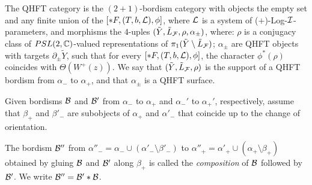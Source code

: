 \begin{defi} \label{QHBdef} {\rm The QHFT category is the
    $(2+1)$-bordism category with objects the empty set
    and any finite union of the $[*F,(T,b,{\mathcal L}),\phi]$, where ${\mathcal L}$ is a
    system of ($+$)-Log-${\mathcal I}$-parameters, and morphisms the 4-uples
    $(\tilde{Y},\tilde{L}_{\mathcal F},\rho,\alpha_\pm)$, where: $\rho$ is a
    conjugacy class of $PSL(2,{\mathbb C})$-valued representations of
    $\pi_1(\tilde{Y} \setminus \tilde{L}_{\mathcal F})$; $\alpha_\pm$ are QHFT
    objects with targets $\partial_\pm \tilde{Y}$, such that for every
    $[* F,(T,b,{\mathcal L}),\phi]$, the character $\phi^*(\rho)$ coincides
    with $\Theta(W^+(z))$. We say that $(\tilde{Y},\tilde{L}_{\mathcal F},
    \rho)$ is the support of a QHFT bordism from $\alpha_-$ to
    $\alpha_+$, and that $\alpha_\pm$ is a QHFT surface.}
\end{defi}
Given bordisms ${\mathcal B}$ and ${\mathcal B}'$ from $\alpha_-$ to $\alpha_+$ and
$\alpha_-'$ to $\alpha_+'$, respectively, assume that $\beta_+$
and $\beta'_-$ are subobjects of $\alpha_+$ and $\alpha'_-$ that
coincide up to the change of orientation.
\begin{defi}\label{composition}{\rm
The bordism ${\mathcal B}''$ from $\alpha''_- = \alpha_- \cup (\alpha'_-
\setminus \beta'_-)$ to $\alpha''_+ = \alpha'_+ \cup (\alpha_+
\setminus \beta_+)$ obtained by gluing ${\mathcal B}$ and ${\mathcal B}'$ along
$\beta_+$ is called the {\it composition} of ${\mathcal B}$ followed by
${\mathcal B}'$. We write ${\mathcal B}'' = {\mathcal B}'*{\mathcal B}$. }
\end{defi}

